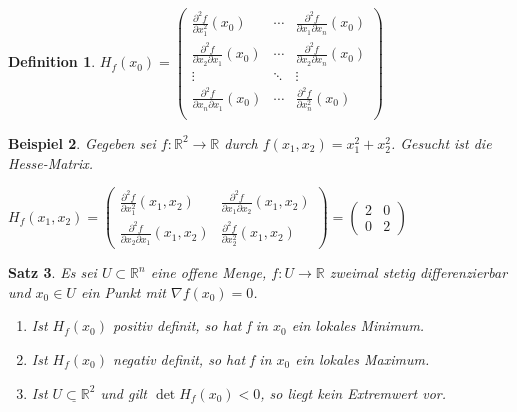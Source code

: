 \documentclass[fontset=ubuntu,11pt,a4paper,fleqn,headsepline]{scrreprt}
\newtheorem{defi}{Definition}[section]
\newtheorem{beispiel}[defi]{Beispiel}
\newtheorem{satz}[defi]{Satz}
\begin{document}
\begin{multicols}{2}
\begin{defi}
        \(H_f(x_0)=\begin{pmatrix}
        \frac{\partial^2 f}{\partial x_1^2}(x_0) & \cdots & \frac{\partial^2 f}{\partial x_1 \partial x_n}(x_0) \\
        \frac{\partial^2 f}{\partial x_2 \partial x_1}(x_0) & \cdots & \frac{\partial^2 f}{\partial x_2 \partial x_n}(x_0) \\
        \vdots & \ddots & \vdots \\
        \frac{\partial^2 f}{\partial x_n \partial x_1}(x_0) & \cdots & \frac{\partial^2 f}{\partial x_n^2}(x_0) \\
        \end{pmatrix}\)
    \end{defi}
    
    \begin{beispiel}
        Gegeben sei \(f:\mathbb{R}^2\to\mathbb{R}\) durch \(f(x_1,x_2)=x_1^2+x_2^2\). Gesucht ist die Hesse-Matrix.
        
        \(H_f(x_1,x_2)=\begin{pmatrix}
        \frac{\partial^2 f}{\partial x_1^2}(x_1,x_2)  & \frac{\partial^2 f}{\partial x_1 \partial x_2}(x_1,x_2) \\
        \frac{\partial^2 f}{\partial x_2 \partial x_1}(x_1,x_2) & \frac{\partial^2 f}{\partial x_2^2}(x_1,x_2)
        \end{pmatrix}=\begin{pmatrix}
        2 & 0 \\ 0 & 2
        \end{pmatrix}\)
    \end{beispiel}
    
    \begin{satz}
        Es sei \(U\subset\mathbb{R}^n\) eine offene Menge, \(f:U\to\mathbb{R}\) zweimal stetig differenzierbar und \(x_0\in U\) ein Punkt mit \(\nabla f(x_0)=0\).
        \begin{enumerate}[label=\emph{(\roman*)}]
            \item Ist \(H_f(x_0)\) positiv definit, so hat f in \(x_0\) ein lokales Minimum.
            \item Ist \(H_f(x_0)\) negativ definit, so hat f in \(x_0\) ein lokales Maximum.
            \item Ist \(\underline{U\subset\mathbb{R}^2}\) und gilt \(\det H_f(x_0) < 0\), so liegt kein Extremwert vor.
        \end{enumerate}
    \end{satz}
    

\end{multicols}
\end{document}
